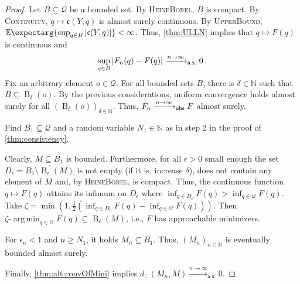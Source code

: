 \documentclass{scrartcl}
\renewcommand{\subset}{\subseteq}
\DeclareMathOperator{\ball}{\mathrm{B}}
\newcommand{\Ex}{\E\expectarg}
\newcommand*{\mc}[1]{\mathcal{#1}}
\newcommand*{\ms}[1]{\mathsf{#1}}
\newcommand*{\mf}[1]{\mathfrak{#1}}
\newcommand{\N}{\mathbb{N}}
\newcommand{\equationFullstop}{\, .}
\newcommand{\eqfs}{\equationFullstop}
\DeclareMathOperator*{\argmin}{arg\,min}
\theoremstyle{plain}\newtheorem{theorem}{Theorem}[section]
\theoremstyle{definition}
\theoremstyle{remark}
\begin{document}
\begin{appendix}
\begin{proof}
Let $B\subset\mc Q$ be a bounded set.
By \textsc{HeineBorel}, $\overline{B}$ is compact.
By \textsc{Continuity}, $q \mapsto \mf c(Y, q)$ is almost surely continuous.
By \textsc{UpperBound}, $\Ex{ \sup_{q\in B}\abs{\mf c(Y, q)}} < \infty$. Thus, \autoref{thm:ULLN} implies that $q \mapsto F(q)$ is continuous and
\begin{equation*}
	\sup_{q\in B}  \abs{F_n(q)-F(q)} \xrightarrow{n\to\infty}_{\ms{a.s.}}0
	\eqfs
\end{equation*}
Fix an arbitrary element $o\in\mc Q$. For all bounded sets $B$, there is $\delta \in\N$ such that $B \subset \ball_\delta(o)$. By the previous considerations, uniform convergence holds almost surely for all $(\ball_{\delta}(o))_{\delta\in\N}$.
Thus, $F_n \xrightarrow{n\to\infty}_{\mathsf{ubs}} F$ almost surely.

\noindent
\underline{}
Find $B_1\subset\mc Q$ and a random variable $N_1\in\N$ as in step 2 in the proof of \autoref{thm:consistency}.

\noindent
\underline{}
Clearly, $M \subset B_1$ is bounded. Furthermore, for all $\epsilon > 0$ small enough the set $D_\epsilon = \overline{B_1 \setminus \ball_\epsilon(M)}$ is not empty (if it is, increase $\delta$), does not contain any element of $M$ and, by \textsc{HeineBorel}, is compact. Thus, the continuous function $q\mapsto F(q)$ attains its infimum on $D_\epsilon$ where $\inf_{q\in D_\epsilon} F(q) > \inf_{q\in \mc Q} F(q)$. Take $\zeta = \min(1, \frac12(\inf_{q\in D_\epsilon} F(q) - \inf_{q\in \mc Q} F(q)))$. Then $\zeta\text{-}\argmin_{q\in\mc Q} F(q) \subset \ball_\epsilon(M)$, i.e., $F$ has approachable minimizers. 

\noindent
\underline{}
For $\epsilon_n < 1$ and $n \geq N_1$, it holds $M_n \subset B_1$. Thus, $(M_n)_{n\in\N}$ is eventually bounded almost surely.

\noindent
\underline{}
Finally, \autoref{thm:alt:convOfMini} implies $d_\subset(M_n, M) \xrightarrow{n\to\infty}_{\ms{a.s.}} 0$.
\end{proof}

\end{appendix}
\end{document}
